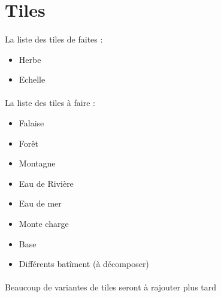 \section{Tiles}

\paragraph{} La liste des tiles de faites :
\begin{itemize}
	\item Herbe
	\item Echelle
\end{itemize}

\paragraph{} La liste des tiles à faire :
\begin{itemize}
	\item Falaise
	\item Forêt
	\item Montagne
	\item Eau de Rivière
	\item Eau de mer
	\item Monte charge
	\item Base
	\item Différents batîment (à décomposer)
\end{itemize}

\paragraph{} Beaucoup de variantes de tiles seront à rajouter plus tard
